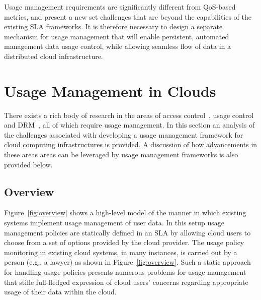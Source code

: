 \documentclass[10pt, conference, compsocconf]{IEEEtran}
\begin{document}
Usage management requirements are significantly different from QoS-based metrics, and present a new set challenges that are beyond the capabilities of the existing SLA frameworks. It is therefore necessary to design a separate mechanism for usage management that will enable persistent, automated management data usage control, while allowing seamless flow of data in a distributed cloud infrastructure. 



\section{Usage Management in Clouds}\label{sec:clouds-usage}
There exists a rich body of research in the areas of access control~\cite{BlPa:73,BlPa:76}, usage control~\cite{PaSa:04,JaHeLa:10} and DRM~\cite{ArHu:07,HaWe:08, ODRL-req,JaHe:08,XrML-spec}, all of which require usage management.  In this section an analysis of the challenges associated with developing a usage management framework for cloud computing infrastructures is provided. A discussion of how advancements in these areas areas can be leveraged by usage management frameworks is also provided below.

\subsection{Overview}



Figure~\ref{fig:overview} shows a high-level model of the manner in which existing systems implement usage management of user data. In this setup usage management policies are statically defined in an SLA by allowing cloud users to choose from a set of options provided by the cloud provider. The usage policy monitoring in existing cloud systems, in many instances, is carried out by a person (e.g., a lawyer) as shown in Figure~\ref{fig:overview}.  Such a static approach for handling usage policies presents numerous problems for usage management that stifle full-fledged expression of cloud users' concerns regarding appropriate usage of their data within the cloud.   
\end{document}
